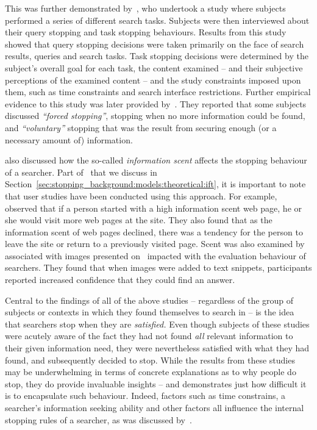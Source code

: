 This was further demonstrated by~\cite{wu2014information_scent}, who undertook a study where subjects performed a series of different search tasks. Subjects were then interviewed about their query stopping and task stopping behaviours. Results from this study showed that query stopping decisions were taken primarily on the face of search results, queries and search tasks. Task stopping decisions were determined by the subject's overall goal for each task, the content examined -- and their subjective perceptions of the examined content -- and the study constraints imposed upon them, such as time constraints and search interface restrictions. Further empirical evidence to this study was later provided by~\cite{wu2014stopping_query_abandonment}. They reported that some subjects discussed \emph{``forced stopping''}, stopping when no more information could be found, and \emph{``voluntary''} stopping that was the result from securing enough (or a necessary amount of) information.

\cite{wu2014information_scent} also discussed how the so-called \emph{information scent} affects the stopping behaviour of a searcher. Part of~ that we discuss in Section~\ref{sec:stopping_background:models:theoretical:ift}, it is important to note that user studies have been conducted using this approach. For example,~\cite{card2001scent_graphs} observed that if a person started with a high information scent web page, he or she would visit more web pages at the site. They also found that as the information scent of web pages declined, there was a tendency for the person to leave the site or return to a previously visited page. Scent was also examined by~\cite{loumakis2011image_smells} associated with images presented on~ impacted with the evaluation behaviour of searchers. They found that when images were added to text snippets, participants reported increased confidence that they could find an answer.

Central to the findings of all of the above studies -- regardless of the group of subjects or contexts in which they found themselves to search in -- is the idea that searchers stop when they are \emph{satisfied.} Even though subjects of these studies were acutely aware of the fact they had not found \emph{all} relevant information to their given information need, they were nevertheless satisfied with what they had found, and subsequently decided to stop. While the results from these studies may be underwhelming in terms of concrete explanations as to why people do stop, they do provide invaluable insights -- and demonstrates just how difficult it is to encapsulate such behaviour. Indeed, factors such as time constrains, a searcher's information seeking ability and other factors all influence the internal stopping rules of a searcher, as was discussed by~\cite{marchionini1995information_seeking}. 

